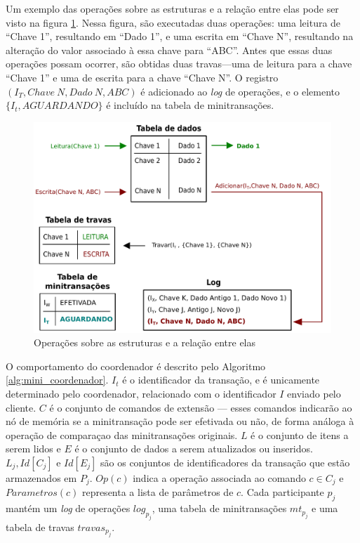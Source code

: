 \documentclass[11pt,twoside,a4paper]{book}
\begin{document}
Um exemplo das operações sobre as estruturas e a relação entre elas pode ser visto na figura \ref{fig:estruturas}. Nessa figura, são executadas duas operações: uma leitura de ``Chave 1'', resultando em ``Dado 1'', e uma escrita em ``Chave N'', resultando na alteração do valor associado à essa chave para ``ABC''. Antes que essas duas operações possam ocorrer, são obtidas duas travas---uma de leitura para a chave ``Chave 1'' e uma de escrita para a chave ``Chave N''. O registro $(I_T, Chave\ N, Dado\ N, ABC)$ é adicionado ao \emph{log} de operações, e o elemento $\{I_t, AGUARDANDO\}$ é incluído na tabela de minitransações.

\begin{figure}
  \centering
  \includegraphics[width=.90\textwidth]{estruturas} 
  \caption{Operações sobre as estruturas e a relação entre elas}
  \label{fig:estruturas} 
\end{figure}

O comportamento do coordenador é descrito pelo Algoritmo \ref{alg:mini_coordenador}. $I_t$ é o identificador da transação, e é unicamente determinado pelo coordenador, relacionado com o identificador $I$ enviado pelo cliente. $C$ é o conjunto de comandos de extensão --- esses comandos indicarão ao nó de memória se a minitransação pode ser efetivada ou não, de forma análoga à operação de comparaçao das minitransações originais. $L$ é o conjunto de itens a serem lidos e $E$ é o conjunto de dados a serem atualizados ou inseridos. $L_j, Id[C_j]\text{ e } Id[E_j]$ são os conjuntos de identificadores da transação que estão armazenados em $P_j$. $Op(c)$ indica a operação associada ao comando $c \in C_j$ e $Parametros(c)$ representa a lista de parâmetros de $c$. Cada participante $p_j$ mantém um \emph{log} de operações $log_{p_j}$, uma tabela de minitransações $mt_{p_j}$ e uma tabela de travas $travas_{p_j}$.
\end{document}
